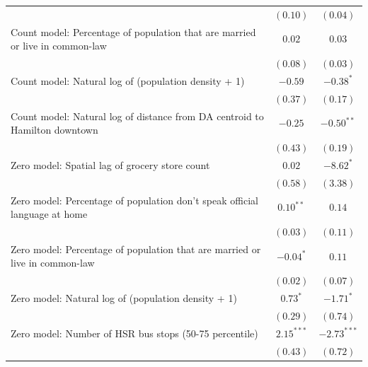 \documentclass[preprint, 3p,
authoryear]{elsarticle} %
\begin{document}
\begin{table}
\begin{center}
\begin{footnotesize}
\begin{tabular}{l c c}
                                                                              & $(0.10)$     & $(0.04)$        \\
Count model: Percentage of population that are married or live in common-law  & $0.02$       & $0.03$          \\
                                                                              & $(0.08)$     & $(0.03)$        \\
Count model: Natural log of (population density + 1)                          & $-0.59$      & $-0.38^{*}$     \\
                                                                              & $(0.37)$     & $(0.17)$        \\
Count model: Natural log of distance from DA centroid to Hamilton downtown    & $-0.25$      & $-0.50^{**}$    \\
                                                                              & $(0.43)$     & $(0.19)$        \\
Zero model: Spatial lag of grocery store count                                & $0.02$       & $-8.62^{*}$     \\
                                                                              & $(0.58)$     & $(3.38)$        \\
Zero model: Percentage of population don't speak official language at home    & $0.10^{**}$  & $0.14$          \\
                                                                              & $(0.03)$     & $(0.11)$        \\
Zero model: Percentage of population that are married or live in common-law   & $-0.04^{*}$  & $0.11$          \\
                                                                              & $(0.02)$     & $(0.07)$        \\
Zero model: Natural log of (population density + 1)                           & $0.73^{*}$   & $-1.71^{*}$     \\
                                                                              & $(0.29)$     & $(0.74)$        \\
Zero model: Number of HSR bus stops (50-75 percentile)                        & $2.15^{***}$ & $-2.73^{***}$   \\
                                                                              & $(0.43)$     & $(0.72)$        \\

\end{tabular}
\end{footnotesize}
\end{center}
\end{table}
\end{document}
